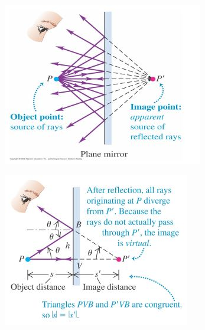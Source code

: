 \documentclass[a4paper, 11pt, normalem]{report}
\begin{document}
\begin{figure}[H]
    \centering
    \begin{subfigure}{0.4\textwidth}
        \includegraphics[width=\textwidth]{Mirror1.jpg}
    \end{subfigure}
    \begin{subfigure}{0.4\textwidth}
        \includegraphics[width=\textwidth]{Mirror2.jpg}
    \end{subfigure}
\end{figure}
\end{document}
